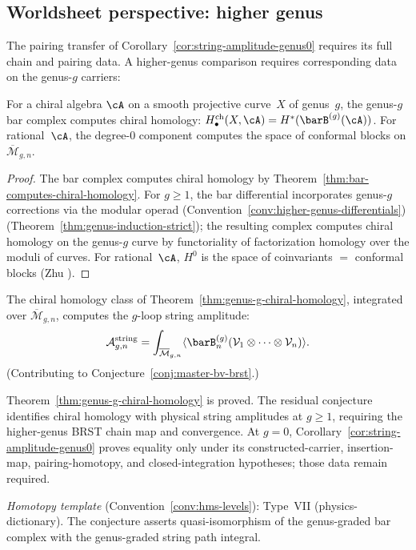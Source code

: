 \subsection{Worldsheet perspective: higher genus}

The pairing transfer of Corollary~\ref{cor:string-amplitude-genus0} requires its full chain and pairing data. A higher-genus comparison requires corresponding data on the genus-$g$ carriers:

\begin{theorem}
\label{thm:genus-g-chiral-homology}
For a chiral algebra $\cA$ on a smooth projective
curve~$X$ of genus~$g$, the genus-$g$ bar complex
computes chiral homology:
$H_\bullet^{\mathrm{ch}}(X, \cA)
= H^*(\barB^{(g)}(\cA))$.
For rational~$\cA$, the degree-$0$ component computes
the space of conformal blocks on
$\overline{\mathcal{M}}_{g,n}$.
\end{theorem}

\begin{proof}
The bar complex computes chiral homology by
Theorem~\ref{thm:bar-computes-chiral-homology}.
For $g \geq 1$, the bar differential incorporates
genus-$g$ corrections via the modular operad
(Convention~\ref{conv:higher-genus-differentials})
(Theorem~\ref{thm:genus-induction-strict}); the
resulting complex computes chiral homology on the
genus-$g$ curve by functoriality of factorization
homology over the moduli of curves.  For rational~$\cA$,
$H^0$ is the space of coinvariants $=$ conformal blocks
(Zhu \cite{Zhu96}).
\end{proof}

\begin{conjecture}
\label{conj:string-amplitude-higher-genus}
The chiral homology class of
Theorem~\ref{thm:genus-g-chiral-homology}, integrated
over $\overline{\mathcal{M}}_{g,n}$, computes the
$g$-loop string amplitude:
\[
\mathcal{A}_{g,n}^{\mathrm{string}}
= \int_{\overline{\mathcal{M}}_{g,n}}
\langle \barB^{(g)}_n
(\mathcal{V}_1 \otimes \cdots
\otimes \mathcal{V}_n) \rangle.
\]
(Contributing to Conjecture~\ref{conj:master-bv-brst}.)
\end{conjecture}

\begin{remark}[Scope]
Theorem~\ref{thm:genus-g-chiral-homology} is proved.
The residual conjecture identifies chiral homology
with physical string amplitudes at $g \geq 1$,
requiring the higher-genus BRST chain map and convergence.
At $g=0$, Corollary~\ref{cor:string-amplitude-genus0} proves equality only under its constructed-carrier, insertion-map, pairing-homotopy, and closed-integration hypotheses; those data remain required.

\emph{Homotopy template} (Convention~\ref{conv:hms-levels}): Type~VII
(physics-dictionary).  The conjecture asserts quasi-isomorphism of the
genus-graded bar complex with the genus-graded string path integral.
\end{remark}

